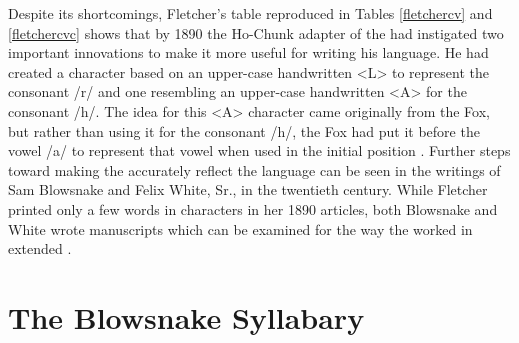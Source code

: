 \documentclass[output=paper]{LSP/langsci}
\begin{document}
Despite its shortcomings, Fletcher's table reproduced in Tables \ref{fletchercv} and \ref{fletchercvc} shows that by 1890 the Ho-Chunk adapter of the   had instigated two important innovations to make it more useful for writing his language. He had created a character based on an upper-case handwritten <L> to represent the  consonant /r/ and one resembling an upper-case handwritten <A> for the consonant /h/. The idea for this <A> character came originally from the Fox, but rather than using it for the consonant /h/, the Fox had put it before the vowel /a/ to represent that vowel when used in the initial position \citep[170]{Walker1996}. Further steps toward making the   accurately reflect the language can be seen in the writings of Sam Blowsnake and Felix White, Sr., in the twentieth century. While Fletcher printed only a few words in  characters in her 1890 articles, both Blowsnake and White wrote manuscripts which can be examined for the way the  worked in extended . 

\section{The Blowsnake Syllabary}
\end{document}
